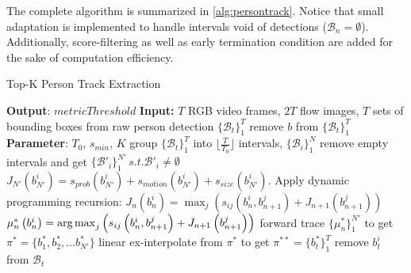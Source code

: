 The complete algorithm is summarized in \autoref{alg:persontrack}. Notice that small adaptation is implemented to handle intervals void of detections ($ \mathcal{B}_{n} = \emptyset $). 
Additionally, score-filtering as well as early termination condition are added for the sake of computation efficiency.

\begin{algorithm}[b]
\small
	\caption{Top-K Person Track Extraction}
	\label{alg:persontrack}
	\begin{algorithmic}[1]
		\State \textbf{Output}: $ metricThreshold $
		\State \textbf{Input:} 
		\NewLine $ T $ RGB video frames, 
		\NewLine $ 2T $ flow images, 
		\NewLine $ T $ sets of bounding boxes from raw person detection $\lbrace \mathcal{B}_{t} \rbrace_{1}^{T}$
		 
		\State remove $ b $ from $\lbrace \mathcal{B}_{t} \rbrace_{1}^{T}$
		\EndIf
		\State \textbf{Parameter}: $ T_{0} $, $ s_{min} $, $ K $
		 
		\State group $\lbrace \mathcal{B}_{t} \rbrace_{1}^{T}$ into $ \lfloor \frac{T}{T_{0}}\rfloor $ intervals, $ \lbrace \mathcal{B}_{i}\rbrace_{1}^{N} $
		\State remove empty intervals and get $ \lbrace \mathcal{B}'_{i}\rbrace_{1}^{N'}\, s.t. \mathcal{B}'_{i} \not = \emptyset$
			\Break
		\EndIf
		\State $ J_{N'}\left(b_{N'}^{i}\right) = s_{prob}\left(b^{i}_{N'}\right) + s_{motion}\left(b^{i}_{N'}\right)+ s_{size}\left(b^{i}_{N'}\right).$
		\Repeat
		\State Apply dynamic programming recursion:
		\NewLine $  J_{n}\left(b_{n}^{i}\right) = \max_{j} \left(s_{ij}\left(b_{n}^{i}, b_{n+1}^{j}\right) +  J_{n+1}\left(b_{n+1}^{j}\right)\right)$
		\NewLine $ \mu_{n}^{*}\left(b_{n}^{i}\right) = \operatorname*{arg\,max}_{j} \left(s_{ij}\left(b_{n}^{i}, b_{n+1}^{j}\right) +  J_{n+1}\left(b_{n+1}^{j}\right)\right) $
		 
		\Break
		\EndIf
		\State forward trace $ \lbrace \mu_{n}^{*}\rbrace_{1}^{N'}$ to get $ \pi^{*} = \lbrace b_{1}^{*}, b_{2}^{*}, \dots b_{N'}^{*}\rbrace$
		\EndProcedure
		\State linear ex-interpolate from $ \pi^{*} $ to get $ \pi^{**} = \lbrace b_{t}^{*}\rbrace_{1}^{T}$
		\State remove $ b_{t}^{i} $ from $ \mathcal{B}_{t} $
		\EndIf
		\EndFor
		\EndFor
	\end{algorithmic}
\end{algorithm}

